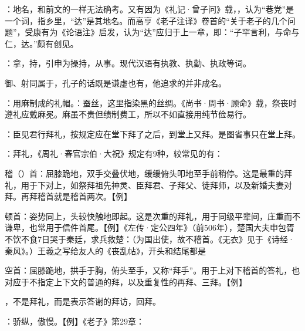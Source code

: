 {
\begin{lyitemize}
\item {}：地名，和前文的一样无法确考。又有因为《礼记·曾子问》载，，认为“巷党”是一个词，指乡里，“达”是其地名。而高亨《老子注译》卷首的“关于老子的几个问题”，受康有为《论语注》启发，认为“达”应归于上一章，即：“子罕言利，与命与仁，达。”颇有创见。%

\item {}：拿，持，引申为操持，从事。现代汉语有执教、执勤、执政等词。
\end{lyitemize}
御、射同属于，孔子的话既是谦虚也有，他追求的并非成名。
}
{}


{
\item {}：用麻制成的礼帽。：蚕丝，这里指染黑的丝绸。《尚书·周书·顾命》载，祭丧时遵礼应戴麻冕。麻虽不贵但绩制费工，所以不如直接用纯节俭易行。
\item {}：臣见君行拜礼，按规定应在堂下拜了之后，到堂上又拜。是图省事只在堂上拜。%

：拜礼，《周礼·春官宗伯·大祝》规定有9种，较常见的有：
\begin{lyitemize}
\item 稽（）首：屈膝跪地，双手交叠伏地，缓缓俯头叩地至手前稍停。这是最重的拜礼，用于下对上，如祭拜祖先神灵、臣拜君、子拜父、徒拜师，以及新婚夫妻对拜。再拜稽首就是稽首两次。【例】
\item 顿首：姿势同上，头较快触地即起。这是次重的拜礼，用于同级平辈间，庄重而不谦卑，也常用于信件首尾。【例】《左传·定公四年》（前506年），楚国大夫申包胥不饮不食7日哭于秦廷，求兵救楚：（为国出使，故不稽首。《无衣》见于《诗经·秦风》。）王羲之写给友人的《丧乱帖》，开头和结尾都是  %
\item {}空首：屈膝跪地，拱手于胸，俯头至手，又称“拜手”。用于上对下稽首的答礼，也对应于不指定上下文的普通的拜，以及重复性的再拜、三拜。【例】  
\end{lyitemize}
 ，不是拜礼，而是表示答谢的拜访，回拜。
\item {}：骄纵，傲慢。【例】《老子》第29章：
}
{}


